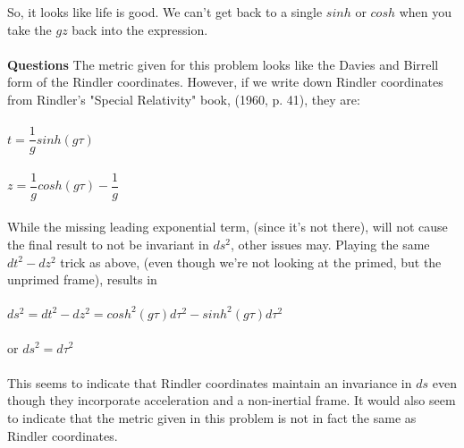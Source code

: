 \documentclass[prb,preprint]
{revtex4-1}
\newcommand{\PRLsep}{\noindent\makebox[\linewidth]{\resizebox{0.8888\linewidth}{2pt}{$\bullet$}}\bigskip}
\begin{document}
So, it looks like life is good.  We can't get back to a single $sinh$ or $cosh$ when you take the $gz$ back into the expression.
\\
\\
\textbf{Questions}
The metric given for this problem looks like the Davies and Birrell form of the Rindler coordinates.  However, if we write down Rindler coordinates from Rindler's "Special Relativity" book, (1960, p. 41), they are:
\\
\\
$t = \dfrac{1}{g}sinh\left(g \tau\right)$
\\
\\
$z = \dfrac{1}{g}cosh\left(g \tau\right) - \dfrac{1}{g}$
\\
\\
While the missing leading exponential term, (since it's not there), will not cause the final result to not be invariant in $ds^2$, other issues may.  Playing the same $dt^2 - dz^2$ trick as above, (even though we're not looking at the primed, but the unprimed frame), results in 
\\
\\
$ds^2 = dt^2 - dz^2 = cosh^2\left(g\tau\right)d\tau^2 - sinh^2\left(g\tau\right)d\tau^2$
\\
\\
or $ds^2 = d\tau^2$
\\
\\
This seems to indicate that Rindler coordinates maintain an invariance in $ds$ even though they incorporate acceleration and a non-inertial frame.  It would also seem to indicate that the metric given in this problem is not in fact the same as Rindler coordinates.
\\
\\
\PRLsep



\end{document}
